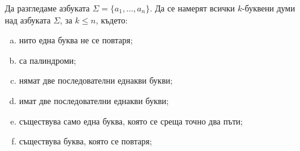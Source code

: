 \begin{problem}
  Да разгледаме азбуката $\Sigma = \{a_1,\dots,a_n\}$.
  Да се намерят всички $k$-буквени думи над азбуката $\Sigma$, за $k \leq n$, където:
  \begin{enumerate}[a)]
  \item
    нито една буква не се повтаря;
  \item
    са палиндроми;
  \item
    нямат две последователни еднакви букви;
  \item
    имат две последователни еднакви букви;
  \item
    съществува само една буква, която се среща точно два пъти;
  \item
    съществува буква, която се повтаря;
  \end{enumerate}
\end{problem}


